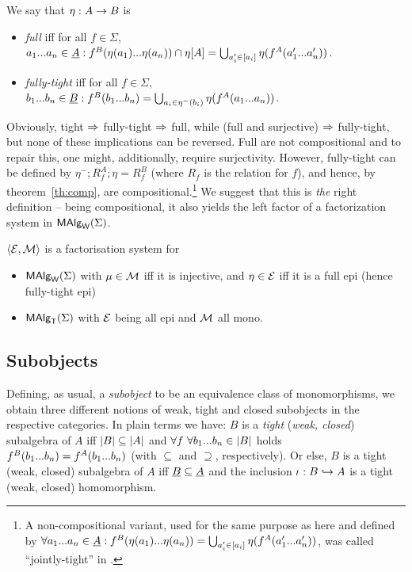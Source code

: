 \documentclass[10pt]{article}
\begin{document}
\begin{Definition}
\label{de:jtight}
We say that  $\eta:A\rightarrow B$ is
\begin{itemize}\MyLPar
\item
{\em full} iff for all $f\in\Sigma$,
$a_{1}...a_{n}\in\underline {A} : f^B(\eta(a_{1})...\eta(a_{n})) \cap \eta[A] = 
   \bigcup_{a'_{i}\in [a_{i}]} \eta(f^A(a'_{1}...a'_{n}))$.
\item
{\em fully-tight} iff for all $f\in\Sigma$,
$b_{1}...b_{n}\in\underline {B} : f^B(b_{1}...b_{n}) = \bigcup_{a_{i}\in \eta^{-}(b_{i})} \eta(f^A(a_{1}...a_{n}))$.
\end{itemize}
\end{Definition}
%
Obviously, tight $\Rightarrow$ fully-tight $\Rightarrow$ full, while (full and
surjective) $\Rightarrow$ fully-tight, but none of these implications can be
reversed.
Full are not compositional and to repair this, one might, additionally, require
surjectivity. 
However, fully-tight can be defined by
$\eta^-;R^A_f;\eta=R^B_f$ (where $R_f$ is the relation for $f$), and hence, 
by theorem~\ref{th:comp}, are compositional.\footnote{A
non-compositional variant, used for the same purpose as here and 
defined by $\forall a_{1}...a_{n}\in\underline {A}:f^B(\eta(a_{1})...\eta(a_{n})) =
\bigcup_{a'_{i}\in [a_{i}]} \eta(f^A(a'_{1}...a'_{n}))$, was called ``jointly-tight'' in
\cite{c:132}.}
We suggest that this is {\em the} right definition -- being compositional, it 
also yields the left factor of a factorization system in $\mbox{\rm\sf MAlg}_{\sf W}(\Sigma)$.

\begin{Theorem}
\label{le:FSl}\label{le:FSt}
$\langle{\cal E},{\cal M}\rangle$ is a factorisation system for 
\begin{itemize}
\item $\mbox{\rm\sf MAlg}_{\sf W}(\Sigma)$ with
$\mu\in{\cal M}$ iff it is injective, and $\eta\in{\cal E}$ iff it is a full
epi (hence fully-tight epi)
\item
$\mbox{\rm\sf MAlg}_{\sf T}(\Sigma)$ with ${\cal E}$
being all epi and ${\cal M}$ all mono.
\end{itemize}
\end{Theorem}


\subsection{Subobjects}
\label{sub:sub}

Defining, as usual, a {\em subobject\/} to be an equivalence class of
monomorphisms, we obtain three different notions of weak, tight and
closed subobjects in the respective categories.  In plain terms 
we have: $B$ is a {\em
tight} ({\em weak, closed\/}) subalgebra of $A$ %
iff $|B|\subseteq|A|$ and $\forall f\ \forall b_{1}...b_{n}\in|B|$
holds $f^B(b_{1}...b_{n})=f^A(b_{1}...b_{n})$ (with $\subseteq$ and $\supseteq$, respectively).
Or else, $B$ is a tight (weak, closed) subalgebra of $A$ iff
$\underline {B}\subseteq\underline {A}$ and the inclusion $\iota:B\hookrightarrow A$ is a
tight (weak, closed) homomorphism.
\end{document}
